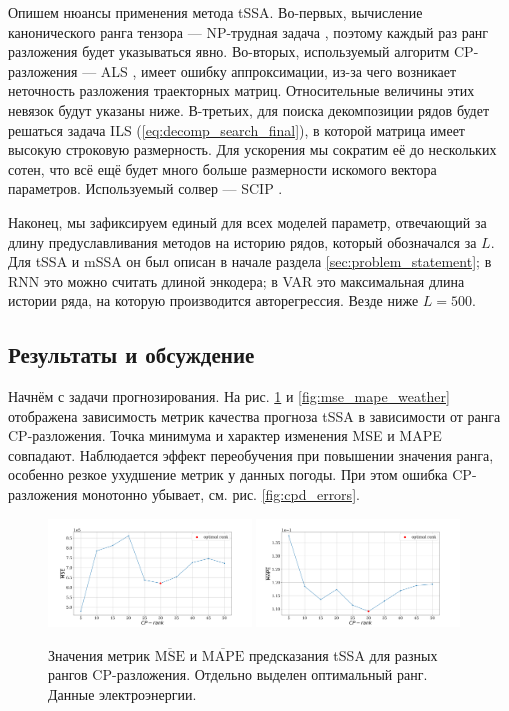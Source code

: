 			Опишем нюансы применения метода tSSA. Во-первых, вычисление канонического ранга тензора --- NP-трудная задача \cite{HASTAD1990644}, поэтому каждый раз ранг разложения будет указываться явно. Во-вторых, используемый алгоритм CP-разложения --- ALS \cite{kolda_tensors}, имеет ошибку аппроксимации, из-за чего возникает неточность разложения траекторных матриц. Относительные величины этих невязок будут указаны ниже. В-третьих, для поиска декомпозиции рядов будет решаться задача ILS (\ref{eq:decomp_search_final}), в которой матрица имеет высокую строковую размерность. Для ускорения мы сократим её до нескольких сотен, что всё ещё будет много больше размерности искомого вектора параметров. Используемый солвер --- SCIP \cite{BolusaniEtal2024ZR}.
			
			Наконец, мы зафиксируем единый для всех моделей параметр, отвечающий за длину предуславливания методов на историю рядов, который обозначался за $ L $. Для tSSA и mSSA он был описан в начале раздела \ref{sec:problem_statement}; в RNN это можно считать длиной энкодера; в VAR это максимальная длина истории ряда, на которую производится авторегрессия. Везде ниже $ L = 500 $.		
				
		\subsection*{Результаты и обсуждение}
		
			Начнём с задачи прогнозирования. На рис. \ref{fig:mse_mape_electr} и \ref{fig:mse_mape_weather} отображена зависимость метрик качества прогноза tSSA в зависимости от ранга CP-разложения. Точка минимума и характер изменения MSE и MAPE совпадают. Наблюдается эффект переобучения при повышении значения ранга, особенно резкое ухудшение метрик у данных погоды. При этом ошибка CP-разложения монотонно убывает, см. рис. \ref{fig:cpd_errors}.
			
			\begin{figure}[h]
				\centering
				\includegraphics[width=0.48\textwidth, keepaspectratio]{../experiments/electricity/tssa/figs/prediction/MSE_rank.png}
				\includegraphics[width=0.48\textwidth, keepaspectratio]{../experiments/electricity/tssa/figs/prediction/MAPE_rank.png}
				\caption{Значения метрик $ \overline{\text{MSE}} $ и $ \overline{\text{MAPE}} $ предсказания tSSA для разных рангов CP-разложения. Отдельно выделен оптимальный ранг. Данные электроэнергии.}\label{fig:mse_mape_electr}
			\end{figure}
			
